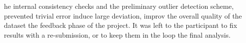 he internal consistency checks and the preliminary outlier detection scheme,  prevented  trivial error  induce  large deviation,  improv the overall quality of the dataset  the feedback phase of the project. It was left to the participant to fix  results with a re-submission, or to keep them in the loop  the final analysis.
